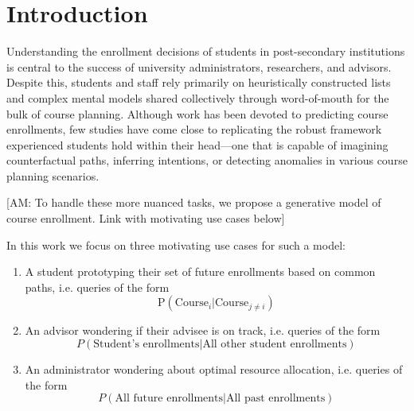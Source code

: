 \documentclass{edm_template}
\providecommand{\am}[1]{{\color{blue} [AM: #1]}}
\begin{document}

\maketitle
\begin{abstract}

\end{abstract}

%


\section{Introduction}

Understanding the enrollment decisions of students in post-secondary institutions is central to the success of university administrators, researchers, and advisors. Despite this, students and staff rely primarily on heuristically constructed lists and complex mental models shared collectively through word-of-mouth for the bulk of course planning. Although work has been devoted to predicting course enrollments, few studies have come close to replicating the robust framework experienced students hold within their head---one that is capable of imagining counterfactual paths, inferring intentions, or detecting anomalies in various course planning scenarios.


\am{To handle these more nuanced tasks, we propose a generative model of course enrollment. Link with motivating use cases below}

In this work we focus on three motivating use cases for such a model:
\vspace{-3mm}
\begin{enumerate}[noitemsep,topsep=0pt]
	\item A student prototyping their set of future enrollments based on common paths, i.e. queries of the form
	$$\text{P}(\text{Course}_i | \text{Course}_{j \neq i})$$ 
	\item An advisor wondering if their advisee is on track, i.e. queries of the form
	$$P(\text{Student's enrollments} | \text{All other student enrollments})$$
	\item An administrator wondering about optimal resource allocation, i.e. queries of the form
	$$P(\text{All future enrollments} | \text{All past enrollments})$$
\end{enumerate}
\end{document}
